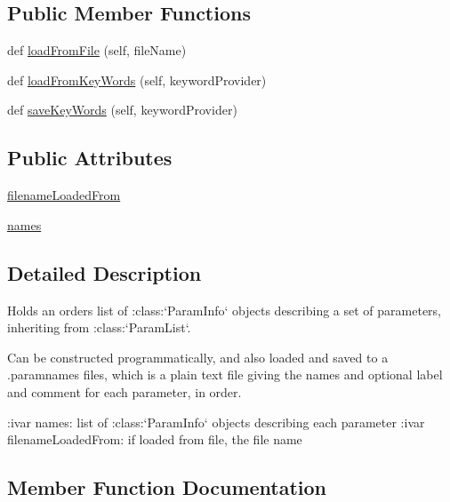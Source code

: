 \subsection*{Public Member Functions}
\begin{DoxyCompactItemize}
\item 
def \mbox{\hyperlink{classgetdist_1_1paramnames_1_1ParamNames_a5666a4e6f847d39fcf256a099ee8d7eb}{load\+From\+File}} (self, file\+Name)
\item 
def \mbox{\hyperlink{classgetdist_1_1paramnames_1_1ParamNames_aca8ef6d2cece1370e86828ebfc7b84a4}{load\+From\+Key\+Words}} (self, keyword\+Provider)
\item 
def \mbox{\hyperlink{classgetdist_1_1paramnames_1_1ParamNames_a6b7a69ffaaadb8fd4c853854ef025842}{save\+Key\+Words}} (self, keyword\+Provider)
\end{DoxyCompactItemize}
\subsection*{Public Attributes}
\begin{DoxyCompactItemize}
\item 
\mbox{\hyperlink{classgetdist_1_1paramnames_1_1ParamNames_a9b1371a13ae4e316ef8e4bb0ca6bdf8c}{filename\+Loaded\+From}}
\item 
\mbox{\hyperlink{classgetdist_1_1paramnames_1_1ParamNames_aed2206642272e0ebb34478932a71b6c5}{names}}
\end{DoxyCompactItemize}


\subsection{Detailed Description}
\begin{DoxyVerb}Holds an orders list of :class:`ParamInfo` objects describing a set of parameters, inheriting from :class:`ParamList`.

Can be constructed programmatically, and also loaded and saved to a .paramnames files, which is a plain text file
giving the names and optional label and comment for each parameter, in order.

:ivar names: list of :class:`ParamInfo` objects describing each parameter
:ivar filenameLoadedFrom: if loaded from file, the file name
\end{DoxyVerb}
 

\subsection{Member Function Documentation}
\mbox{\label{classgetdist_1_1paramnames_1_1ParamNames_a5666a4e6f847d39fcf256a099ee8d7eb}} 
